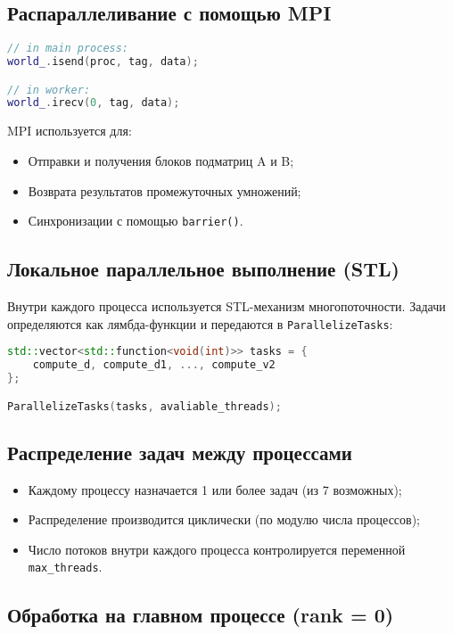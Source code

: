 \documentclass[14pt,a4paper]{extarticle}
\begin{document}
\subsection*{Распараллеливание с помощью MPI}

\begin{lstlisting}[language=C++]
// in main process:
world_.isend(proc, tag, data);

// in worker:
world_.irecv(0, tag, data);
\end{lstlisting}

MPI используется для:
\begin{itemize}
    \item Отправки и получения блоков подматриц A и B;
    \item Возврата результатов промежуточных умножений;
    \item Синхронизации с помощью \texttt{barrier()}.
\end{itemize}

\subsection*{Локальное параллельное выполнение (STL)}

Внутри каждого процесса используется STL-механизм многопоточности. Задачи определяются как лямбда-функции и передаются в \texttt{ParallelizeTasks}:

\begin{lstlisting}[language=C++]
std::vector<std::function<void(int)>> tasks = {
    compute_d, compute_d1, ..., compute_v2
};

ParallelizeTasks(tasks, avaliable_threads);
\end{lstlisting}

\subsection*{Распределение задач между процессами}

\begin{itemize}
  \item Каждому процессу назначается 1 или более задач (из 7 возможных);
  \item Распределение производится циклически (по модулю числа процессов);
  \item Число потоков внутри каждого процесса контролируется переменной \texttt{max\_threads}.
\end{itemize}

\subsection*{Обработка на главном процессе (rank = 0)}
\end{document}
